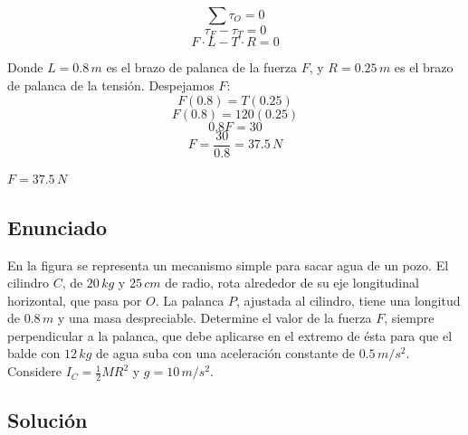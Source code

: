 \documentclass[12pt, a4paper]{article}
\begin{document}
$$\sum \tau_O = 0$$
$$\tau_F - \tau_T = 0$$
$$F \cdot L - T \cdot R = 0$$

Donde $L = 0.8 \, \si{m}$ es el brazo de palanca de la fuerza $F$, y $R = 0.25 \, \si{m}$ es el brazo de palanca de la tensión. Despejamos $F$:
$$F (0.8) = T (0.25)$$
$$F (0.8) = 120 (0.25)$$
$$0.8 F = 30$$
$$F = \frac{30}{0.8} = 37.5 \, \si{N}$$

\begin{tcolorbox}[colback=green!5!white, colframe=green!50!black, title=Respuesta Final]
\centering \Large $F = 37.5 \, \si{N}$
\end{tcolorbox}

\newpage

\subsection*{Enunciado}
En la figura se representa un mecanismo simple para sacar agua de un pozo. El cilindro $C$, de $20 \, \si{kg}$ y $25 \, \si{cm}$ de radio, rota alrededor de su eje longitudinal horizontal, que pasa por $O$. La palanca $P$, ajustada al cilindro, tiene una longitud de $0.8 \, \si{m}$ y una masa despreciable. Determine el valor de la fuerza $F$, siempre perpendicular a la palanca, que debe aplicarse en el extremo de ésta para que el balde con $12 \, \si{kg}$ de agua suba con una aceleración constante de $0.5 \, \si{m/s^2}$. Considere $I_C = \frac{1}{2} M R^2$ y $g = 10 \, \si{m/s^2}$.

\begin{center}
\end{center}

\subsection*{Solución}
\end{document}
